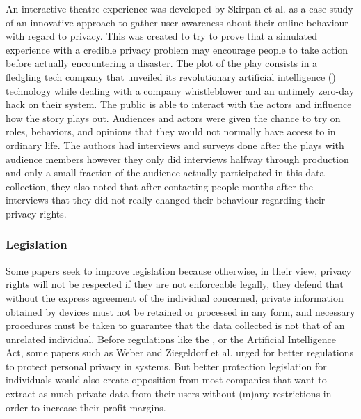 An interactive theatre experience was developed by Skirpan et al. \cite{SkirpanPrivacy}
as a case study of an innovative approach to gather user awareness about their
online behaviour with regard to privacy. This was created to try to prove
that a simulated experience with a credible privacy problem may encourage
people to take action before actually encountering a disaster. The plot
of the play consists in a fledgling tech company that unveiled its revolutionary
artificial intelligence (\hyperlink{\acronym}{\acronym}) technology while dealing with a company whistleblower and an untimely
zero-day hack on their system. The public is able to interact with the actors
and influence how the story plays out. Audiences and actors were given the
chance to try on roles, behaviors, and opinions that they would not normally
have access to in ordinary life. The authors had interviews and surveys
done after the plays with audience members however they only did interviews
halfway through production and only a small fraction of the audience actually
participated in this data collection, they also noted that after contacting
people months after the interviews that they did not really changed their
behaviour regarding their privacy rights.

\subsubsection{Legislation}\label{subsubsection:legislation}

Some papers seek to improve legislation \cite{WEBER2015618, FabianoInternet}
because otherwise, in their view, privacy rights will not be respected if they
are not enforceable legally, they defend that without the express agreement
of the individual concerned, private information obtained by \hyperlink{\acronym}{\acronym} devices
must not be retained or processed in any form, and necessary procedures
must be taken to guarantee that the data collected is not that of an unrelated
individual. Before regulations like the \hyperlink{\acronym}{\acronym}, \hyperlink{\acronym}{\acronym} or the Artificial Intelligence
Act, some papers such as Weber \cite{weber2010internet} and Ziegeldorf et al. \cite{ziegeldorf2014privacy}
urged for better regulations to protect personal privacy in \hyperlink{\acronym}{\acronym} systems.
But better protection legislation for individuals would also create opposition
from most companies that want to extract as much private data from their
users without (m)any restrictions in order to increase their profit margins.


